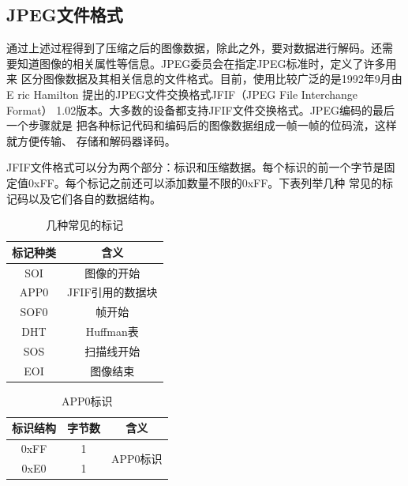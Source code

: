 \documentclass{article}
\numberwithin {equation}{section}
\begin{document}
\begin{spacing}{1.25}
  \subsection{JPEG文件格式}
    \vspace{1em}
    通过上述过程得到了压缩之后的图像数据，除此之外，要对数据进行解码。还需
    要知道图像的相关属性等信息。JPEG委员会在指定JPEG标准时，定义了许多用来
    区分图像数据及其相关信息的文件格式。目前，使用比较广泛的是1992年9月由E
    ric Hamilton 提出的JPEG文件交换格式JFIF（JPEG File Interchange Format）
    1.02版本。大多数的设备都支持JFIF文件交换格式。JPEG编码的最后一个步骤就是
    把各种标记代码和编码后的图像数据组成一帧一帧的位码流，这样就方便传输、
    存储和解码器译码。

    JFIF文件格式可以分为两个部分：标识和压缩数据。每个标识的前一个字节是固
    定值0xFF。每个标记之前还可以添加数量不限的0xFF。下表\cite{JFIF}列举几种
    常见的标记码以及它们各自的数据结构。
    \begin{table}[H]
      \centering
      \caption{几种常见的标记}
      \begin{tabular}{cc}
        \toprule
        标记种类 & 含义\\
        \midrule
        SOI & 图像的开始\\
        APP0 & JFIF引用的数据块\\
        SOF0 & 帧开始\\
        DHT & Huffman表\\
        SOS & 扫描线开始\\
        EOI & 图像结束\\
        \bottomrule
      \end{tabular}
    \end{table}
    
    \begin{table}[H]
      \centering
      \caption{APP0标识}
      \begin{tabular}{ccc}
        \toprule
        标识结构 & 字节数 & 含义\\
        \midrule
        0xFF & 1 & \multirow{2}{*}{APP0标识}\\
        0xE0 & 1 &\\
        \bottomrule
      \end{tabular}
    \end{table}


\end{spacing}
\end{document}
